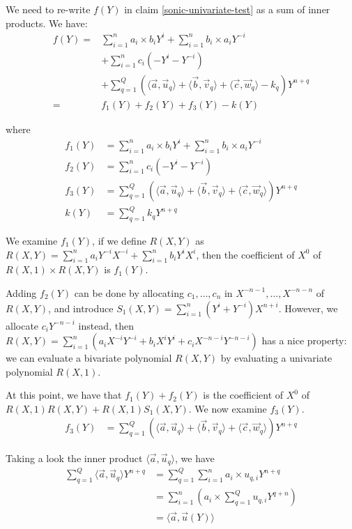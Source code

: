 We need to re-write $f(Y)$ in claim \ref{sonic-univariate-test} as a sum of inner products. We have:
\begin{align*}
f(Y) = &
 \sum_{i=1}^{n} a_i \times b_i Y^i + \sum_{i=1}^{n} b_i \times a_i Y^{-i} \\
& + \sum_{i=1}^{n}c_i (-Y^i -Y^{-i}) \\
& + \sum_{q=1}^{Q} (\langle \Vec{a}, \Vec{u}_q \rangle
      + \langle \Vec{b}, \Vec{v}_q \rangle
      + \langle \Vec{c}, \Vec{w}_q \rangle
      - k_q) Y^{n + q} \\
= & f_1(Y) + f_2(Y) + f_3(Y) - k(Y)
\end{align*}

where
\begin{align*}
f_1(Y) & = \sum_{i=1}^{n} a_i \times b_i Y^i + \sum_{i=1}^{n} b_i \times a_i Y^{-i} \\
f_2(Y) & = \sum_{i=1}^{n}c_i (-Y^i -Y^{-i}) \\
f_3(Y) & = \sum_{q=1}^{Q} (\langle \Vec{a}, \Vec{u}_q \rangle
      + \langle \Vec{b}, \Vec{v}_q \rangle
      + \langle \Vec{c}, \Vec{w}_q \rangle) Y^{n + q} \\
k(Y) & = \sum_{q=1}^{Q} k_q Y^{n + q}
\end{align*}

We examine $f_1(Y)$, if we define $R(X, Y)$ as $R(X, Y) = \sum_{i=1}^n a_i Y^{-i} X^{-i} + \sum_{i=1}^n b_i Y^i X^{i}$, then the coefficient of $X^0$ of $R(X, 1) \times R(X, Y)$ is $f_1(Y)$.

Adding $f_2(Y)$ can be done by allocating $c_1,\dots,c_n$ in $X^{-n-1},\dots,X^{-n-n}$ of $R(X, Y)$, and introduce $S_1(X, Y) = \sum_{i=1}^{n} (Y^{i} + Y^{-i}) X^{n+i}$. However, we allocate $c_i Y^{-n-i}$ instead, then $R(X, Y) = \sum_{i=1}^n (a_i X^{-i} Y^{-i} + b_i X^{i} Y^{i} + c_i X^{-n-i} Y^{-n-i})$ has a nice property: we can evaluate a bivariate polynomial $R(X, Y)$ by evaluating a univariate polynomial $R(X, 1)$.

At this point, we have that $f_1(Y) + f_2(Y)$ is the coefficient of $X^0$ of $R(X, 1) R(X, Y) + R(X, 1) S_1(X, Y)$. We now examine $f_3(Y)$.
\begin{align*}
f_3(Y) & = \sum_{q=1}^{Q} (\langle \Vec{a}, \Vec{u}_q \rangle
      + \langle \Vec{b}, \Vec{v}_q \rangle
      + \langle \Vec{c}, \Vec{w}_q \rangle) Y^{n + q}
\end{align*}

Taking a look the inner product $\langle \Vec{a}, \Vec{u}_q \rangle$, we have
\begin{align*}
\sum_{q=1}^{Q} \langle \Vec{a}, \Vec{u}_q \rangle Y^{n + q}
& = \sum_{q=1}^{Q} \sum_{i=1}^{n} a_i \times u_{q, i} Y^{n + q} \\
& = \sum_{i=1}^{n} \left( a_i \times \sum_{q=1}^Q u_{q, i} Y^{q+n}\right) \\
& = \langle \Vec{a}, \Vec{u}(Y) \rangle
\end{align*}

